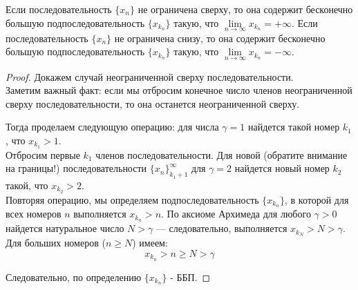 \begin{theorem}
Если последовательность \(\{x_{n}\}\) не ограничена сверху, то она содержит
бесконечно большую подпоследовательность \(\{x_{k_{n}}\}\) такую, что
\(\lim\limits_{n \to \infty}{x_{k_{n}}} = +\infty\).
Если последовательность \(\{x_{n}\}\) не ограничена снизу, то она содержит
бесконечно большую подпоследовательность \(\{x_{k_{n}}\}\) такую, что
\(\lim\limits_{n \to \infty}{x_{k_{n}}}= -\infty\).

\begin{proof}
Докажем случай неограниченной сверху последовательности.\\
Заметим важный факт: если мы отбросим конечное число членов неограниченной
сверху последовательности, то она останется неограниченной сверху.

Тогда проделаем следующую операцию: для числа \(\gamma = 1\) найдется такой
номер \(k_{1}\), что \(x_{k_{1}} > 1.\) \\

Отбросим первые \(k_{1}\) членов последовательности. Для новой
(обратите внимание на границы!) последовательности \(\{x_{n}\}^{\infty}_{k_{1} + 1}\)
для \(\gamma=2\) найдется новый номер \(k_{2}\) такой, что \(x_{k_{2}} > 2\). \\

Повторяя операцию, мы определяем подпоследовательность \(\{x_{k_{n}}\}\),
в которой для всех номеров \(n\) выполняется \(x_{k_{n}} > n\).
По аксиоме Архимеда для любого \(\gamma > 0\) найдется натуральное число \(N > \gamma\) ---
следовательно, выполняется \(x_{k_{N}} > N > \gamma\). Для больших номеров (\(n \geq N\)) имеем:
\[
x_{k_{n}} > n \geq N > \gamma
\]

Следовательно, по определению \(\{x_{k_{n}}\}\) - ББП.
\end{proof}
\end{theorem}



